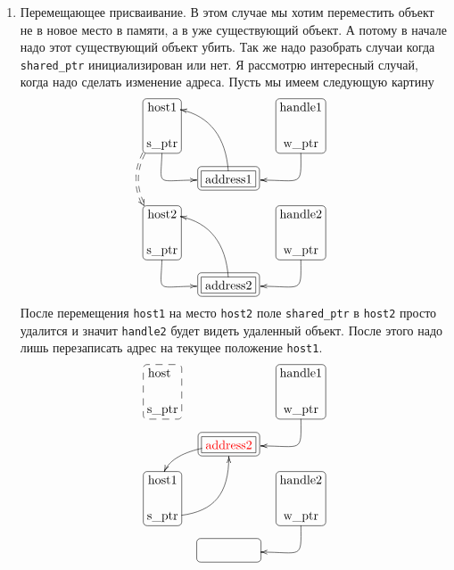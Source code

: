 \begin{enumerate}
\item Перемещающее присваивание.
В этом случае мы хотим переместить объект не в новое место в памяти, а в уже существующий объект.
А потому в начале надо этот существующий объект убить.
Так же надо разобрать случаи когда \verb"shared_ptr" инициализирован или нет.
Я рассмотрю интересный случай, когда надо сделать изменение адреса.
Пусть мы имеем следующую картину
\[
\xymatrix@R=15pt@C=15pt{
  {\text{host1}}
  	{
	\save
   [].[d]*[F-:<3pt>]\frm{}
   \restore
	}
  &{}&{\text{handle1}}
    	{
	\save
   [].[d]*[F-:<3pt>]\frm{}
   \restore
	}
  \\ 
  {\text{s\_ptr}}\ar@(d,l)[dr]+(-9,0)\ar@{==>}@/_10pt/[dd]<-10pt>&{\phantom{address1}}&{\text{w\_ptr}}\ar@(d,r)[dl]+(9,0)\\
  {}&{\text{address1}}\ar@(u,r)[uul]
      	{
	\save
   [].[]*[F-]\frm{}
   \restore
	}
    	{
	\save
   [].[]*+[F-:<3pt>]\frm{}
   \restore
	}
  &{}\\
  {\text{host2}}
  	{
	\save
   [].[d]*[F-:<3pt>]\frm{}
   \restore
	}
  &{}&{\text{handle2}}
    	{
	\save
   [].[d]*[F-:<3pt>]\frm{}
   \restore
	}
  \\ 
  {\text{s\_ptr}}\ar@(d,l)[dr]+(-9,0)&{}&{\text{w\_ptr}}\ar@(d,r)[dl]+(9,0)\\
  {}&{\text{address2}}\ar@(u,r)[uul]
      	{
	\save
   [].[]*[F-]\frm{}
   \restore
	}
    	{
	\save
   [].[]*+[F-:<3pt>]\frm{}
   \restore
	}
  &{}\\
}
\]
После перемещения \verb"host1" на место \verb"host2" поле \verb"shared_ptr" в \verb"host2" просто удалится и значит \verb"handle2" будет видеть удаленный объект.
После этого надо лишь перезаписать адрес на текущее положение \verb"host1".
\[
\xymatrix@R=15pt@C=15pt{
  {\text{host\phantom{1}}}
  	{
	\save
   [].[d]*[F--:<3pt>]\frm{}
   \restore
	}
  &{}&{\text{handle1}}
    	{
	\save
   [].[d]*[F-:<3pt>]\frm{}
   \restore
	}
  \\ 
  {\text{s\_ptr}}&{\phantom{address1}}&{\text{w\_ptr}}\ar@(d,r)[dl]+(9,0)\\
  {}&{\text{\color{red}address2}}\ar@(r,u)[dl]
      	{
	\save
   [].[]*[F-]\frm{}
   \restore
	}
    	{
	\save
   [].[]*+[F-:<3pt>]\frm{}
   \restore
	}
  &{}\\
  {\text{host1}}
  	{
	\save
   [].[d]*[F-:<3pt>]\frm{}
   \restore
	}
  &{}&{\text{handle2}}
    	{
	\save
   [].[d]*[F-:<3pt>]\frm{}
   \restore
	}
  \\ 
  {\text{s\_ptr}}\ar@(r,d)[ruu]+(0,-3)&{}&{\text{w\_ptr}}\ar@(d,r)[dl]+(9,0)\\
  {}&{\phantom{address2}}%
      	{
	\save
   [].[]*\frm{}
   \restore
	}
    	{
	\save
   [].[]*+[F-:<3pt>]\frm{}
   \restore
	}
  &{}\\
}
\]


\end{enumerate}
